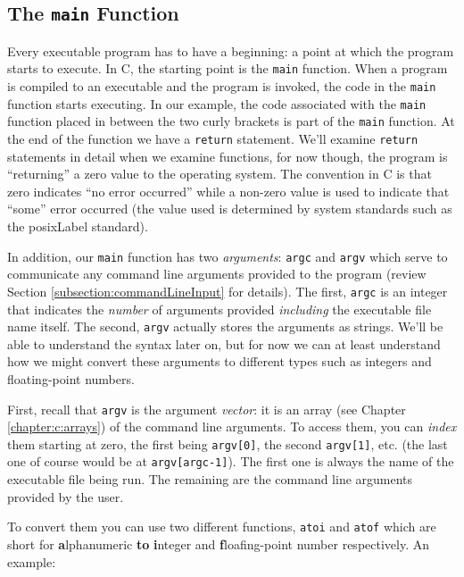 \subsection{The \texttt{main} Function}

Every executable program has to have a beginning: a point at which the
program starts to execute.  In C, the starting point is the \texttt{main}
function.  When a program is compiled to an executable and the program
is invoked, the code in the \texttt{main} function starts executing.  In our
example, the code associated with the \texttt{main} function placed
in between the two curly brackets is part of the \texttt{main} function.
At the end of the function we have a \texttt{return} statement.  We'll
examine \texttt{return} statements in detail when we examine functions, 
for now though, the program is ``returning'' a zero value to the operating system.
The convention in C is that zero indicates ``no error occurred'' while a 
non-zero value is used to indicate that ``some'' error occurred (the 
value used is determined by system standards such as the \gls{posixLabel}
standard).

In addition, our \texttt{main} function has two \emph{arguments}:
\texttt{argc} and \texttt{argv} which serve to communicate
any command line arguments provided to the program (review Section
\ref{subsection:commandLineInput} for details).  The first, \texttt{argc} is an integer that indicates
the \emph{number} of arguments provided \emph{including} the executable
file name itself.  The second, \texttt{argv} actually stores the 
arguments as strings.  We'll be able to understand the syntax later on, but
for now we can at least understand how we might convert these arguments
to different types such as integers and floating-point numbers.

First, recall that \texttt{argv} is the argument \emph{vector}: it 
is an array (see Chapter \ref{chapter:c:arrays}) of the command line arguments.  
To access them, you can \emph{index} them starting at zero, the first being \texttt{argv[0]}, the
second \texttt{argv[1]}, etc. (the last one of course would be at
\texttt{argv[argc-1]}).  The first one is always the name of the
executable file being run.  The remaining are the command line 
arguments provided by the user.

To convert them you can use two different functions, \texttt{atoi}
and \texttt{atof} which are short for \textbf{a}lphanumeric \textbf{to}
\textbf{i}nteger and \textbf{f}loafing-point number respectively.  An 
example:

